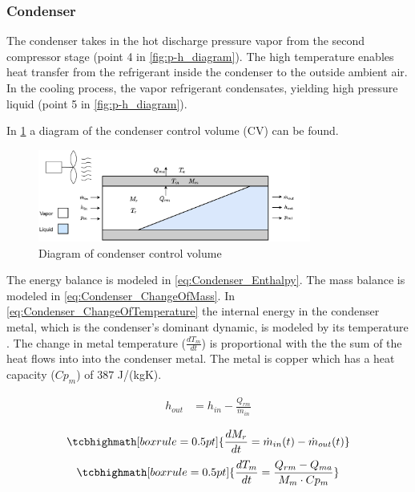 \subsubsection{Condenser}\label{sec:condenser}
The condenser takes in the hot discharge pressure vapor from the second compressor stage (point 4 in \cref{fig:p-h_diagram}). The high temperature enables heat transfer from the refrigerant inside the condenser to the outside ambient air. In the cooling process, the vapor refrigerant condensates, yielding high pressure liquid (point 5 in \cref{fig:p-h_diagram}).

In \cref{fig:condenser_CV} a diagram of the condenser control volume (CV) can be found.

\begin{figure}[h]
	\centering
	\includegraphics[width=0.8\textwidth]{Graphics/Condenser.pdf}
	\caption{Diagram of condenser control volume}
	\label{fig:condenser_CV}
\end{figure}

The energy balance is modeled in \cref{eq:Condenser_Enthalpy}. The mass balance is modeled in \cref{eq:Condenser_ChangeOfMass}. In \cref{eq:Condenser_ChangeOfTemperature} the internal energy in the condenser metal, which is the condenser's dominant dynamic, is modeled by its temperature \cite{Sorensen2013}. The change in metal temperature ($\frac{dT_m}{dt}$) is proportional with the the sum of the heat flows into into the condenser metal. The metal is copper which has a heat capacity ($Cp_m$) of $387$ \si{J}/(\si{kg}\si{K}).


\begin{align}
	h_{out} 			& = h_{in} - \frac{Q_{rm}}{\dot{m}_{in}}  	\label{eq:Condenser_Enthalpy}
\end{align}

\begin{equation}
	\tcbhighmath[boxrule = 0.5pt]{ 	\frac{dM_r}{dt} 	 = \dot{m}_{in}(t) - \dot{m}_{out}(t) }     	\label{eq:Condenser_ChangeOfMass}
\end{equation}
\begin{equation}
	\tcbhighmath[boxrule = 0.5pt]{ 	\frac{dT_m}{dt} 	 = \frac{Q_{rm} - Q_{ma}}{M_m \cdot Cp_m}	 }     \label{eq:Condenser_ChangeOfTemperature}
\end{equation}



